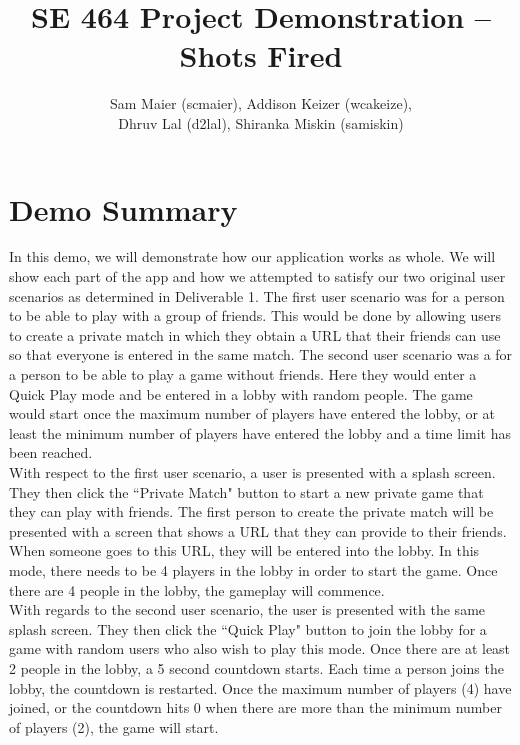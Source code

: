 \documentclass[11pt, oneside]{article}   	%
\title{SE 464 Project Demonstration -- Shots Fired}
\author{Sam Maier (scmaier), Addison Keizer (wcakeize), \\Dhruv Lal (d2lal), Shiranka Miskin (samiskin)}
\begin{document}
\maketitle


\clearpage

\section{Demo Summary}
\hspace*{5mm}
In this demo, we will demonstrate how our application works as whole. We will show
each part of the app and how we attempted to satisfy our two original user scenarios as
determined in Deliverable 1. The first user scenario was for a person to be able
to play with a group of friends. This would be done by allowing users to create
a private match in which they obtain a URL that their friends can use so that
everyone is entered in the same match. The second user scenario was a for a person
to be able to play a game without friends. Here they would enter a Quick Play mode
and be entered in a lobby with random people. The game would start once the maximum
number of players have entered the lobby, or at least the minimum number of players
have entered the lobby and a time limit has been reached.\\

With respect to the first user scenario, a user is presented with a splash screen.
They then click the ``Private Match" button to start a new private game that they
can play with friends. The first person to create the private match will be presented
with a screen that shows a URL that they can provide to their friends. When someone
goes to this URL, they will be entered into the lobby. In this mode,
there needs to be 4 players in the lobby in order to start the game. Once there are 4
people in the lobby, the gameplay will commence.\\

With regards to the second user scenario, the user is presented with the same splash
screen. They then click the ``Quick Play" button to join the lobby for a game with
random users who also wish to play this mode. Once there are at least 2 people in the
lobby, a 5 second countdown starts. Each time a person joins the lobby, the countdown
is restarted. Once the maximum number of players (4) have joined, or the countdown hits
0 when there are more than the minimum number of players (2), the game will start.\\
\end{document}
